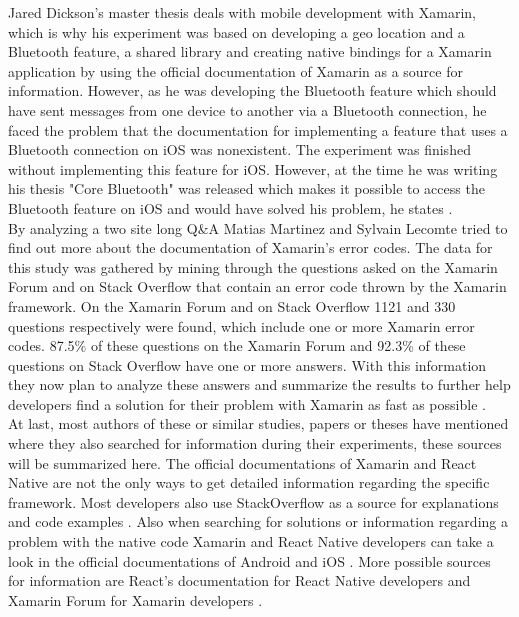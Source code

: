 \documentclass[Bachelor,BIF,english]{twbook}
\begin{document}
Jared Dickson's master thesis deals with mobile development with Xamarin, which is why his experiment was based on developing a geo location and a Bluetooth feature, a shared library and creating native bindings for a Xamarin application by using the official documentation of Xamarin \cite{XamarinDoc} as a source for information. However, as he was developing the Bluetooth feature which should have sent messages from one device to another via a Bluetooth connection, he faced the problem that the documentation for implementing a feature that uses a Bluetooth connection on iOS was nonexistent. The experiment was finished without implementing this feature for iOS. However, at the time he was writing his thesis "Core Bluetooth" was released which makes it possible to access the Bluetooth feature on iOS and would have solved his problem, he states \cite[p.~11]{Dickson_2013}.
\\[\baselineskip]
By analyzing a two site long Q\&A Matias Martinez and Sylvain Lecomte tried to find out more about the documentation of Xamarin's error codes. The data for this study was gathered by mining through the questions asked on the Xamarin Forum and on Stack Overflow that contain an error code thrown by the Xamarin framework. On the Xamarin Forum and on Stack Overflow 1121 and 330 questions respectively were found, which include one or more Xamarin error codes. 87.5\% of these questions on the Xamarin Forum and 92.3\% of these questions on Stack Overflow have one or more answers. With this information they now plan to analyze these answers and summarize the results to further help developers find a solution for their problem with Xamarin as fast as possible \cite[p.~1,~4]{MartinezLecomte2018}.
\\[\baselineskip]
At last, most authors of these or similar studies, papers or theses have mentioned where they also searched for information during their experiments, these sources will be summarized here. The official documentations of Xamarin and React Native are not the only ways to get detailed information regarding the specific framework. Most developers also use StackOverflow as a source for explanations and code examples \cite{MartinezLecomte2018}. Also when searching for solutions or information regarding a problem with the native code Xamarin and React Native developers can take a look in the official documentations of Android and iOS \cite[p.~11]{Dickson_2013}. More possible sources for information are React's documentation for React Native developers \cite{ReactDoc} and Xamarin Forum for Xamarin developers \cite[p.~51]{Danielsson_2016} \cite{MartinezLecomte2018}.
\end{document}

